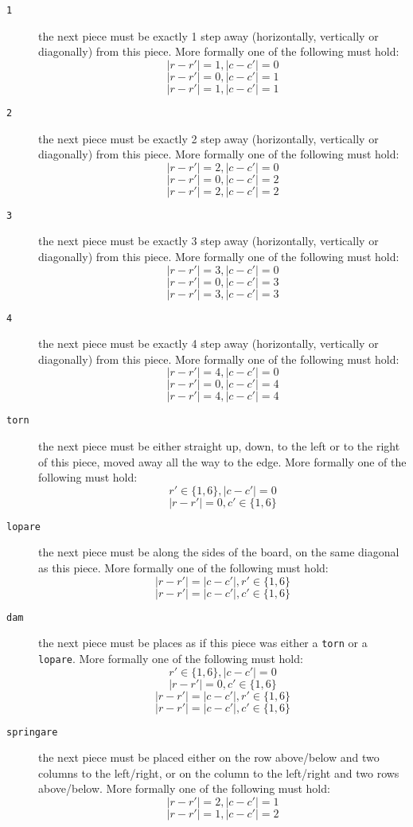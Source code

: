 \begin{description}
  \item[\texttt{1}] the next piece must be exactly 1 step away (horizontally, vertically or diagonally) from this piece.
    More formally one of the following must hold:
    $$|r - r'| = 1, |c - c'| = 0$$
    $$|r - r'| = 0, |c - c'| = 1$$
    $$|r - r'| = 1, |c - c'| = 1$$

  \item[\texttt{2}] the next piece must be exactly 2 step away (horizontally, vertically or diagonally) from this piece.
    More formally one of the following must hold:
    $$|r - r'| = 2, |c - c'| = 0$$
    $$|r - r'| = 0, |c - c'| = 2$$
    $$|r - r'| = 2, |c - c'| = 2$$

  \item[\texttt{3}] the next piece must be exactly 3 step away (horizontally, vertically or diagonally) from this piece.
    More formally one of the following must hold:
    $$|r - r'| = 3, |c - c'| = 0$$
    $$|r - r'| = 0, |c - c'| = 3$$
    $$|r - r'| = 3, |c - c'| = 3$$

  \item[\texttt{4}] the next piece must be exactly 4 step away (horizontally, vertically or diagonally) from this piece.
    More formally one of the following must hold:
    $$|r - r'| = 4, |c - c'| = 0$$
    $$|r - r'| = 0, |c - c'| = 4$$
    $$|r - r'| = 4, |c - c'| = 4$$

  \item[\texttt{torn}] the next piece must be either straight up, down, to the left or to the right of this piece, moved away all the way to the edge.
    More formally one of the following must hold:
    $$r' \in \{1, 6\}, |c - c'| = 0$$
    $$|r - r'| = 0, c' \in \{1, 6\}$$

  \item[\texttt{lopare}] the next piece must be along the sides of the board, on the same diagonal as this piece.
    More formally one of the following must hold:
    $$|r - r'| = |c - c'|, r' \in \{1, 6\}$$
    $$|r - r'| = |c - c'|, c' \in \{1, 6\}$$

  \item[\texttt{dam}] the next piece must be places as if this piece was either a \texttt{torn} or a \texttt{lopare}.
    More formally one of the following must hold:
    $$r' \in \{1, 6\}, |c - c'| = 0$$
    $$|r - r'| = 0, c' \in \{1, 6\}$$
    $$|r - r'| = |c - c'|, r' \in \{1, 6\}$$
    $$|r - r'| = |c - c'|, c' \in \{1, 6\}$$

  \item[\texttt{springare}] the next piece must be placed either on the row above/below and two columns to the left/right, or
    on the column to the left/right and two rows above/below.
    More formally one of the following must hold:
    $$|r - r'| = 2, |c - c'| = 1$$
    $$|r - r'| = 1, |c - c'| = 2$$
\end{description}


